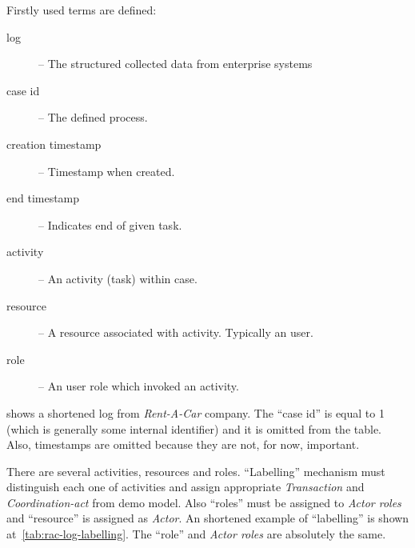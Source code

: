 Firstly used terms are defined:
\begin{description}
\item[log] -- The structured collected data from enterprise systems
\item[case id] -- The defined process.
\item[creation timestamp] -- Timestamp when created.
\item[end timestamp] -- Indicates end of given task.
\item[activity] -- An activity (task) within case.
\item[resource] -- A resource associated with activity. Typically an user.
\item[role] -- An user role which invoked an activity.
\end{description}

 shows a shortened log from \textit{Rent-A-Car} company. The ``case id'' is equal to 1 (which is generally some internal identifier) and it is omitted from the table. Also, timestamps are omitted because they are not, for now, important.  

There are several activities, resources and roles. ``Labelling'' mechanism must distinguish each one of activities and assign appropriate \textit{Transaction} and \textit{Coordination-act} from \gls{demo} model. Also ``roles'' must be assigned to \textit{Actor roles} and ``resource'' is assigned as \textit{Actor}. An shortened example of ``labelling'' is shown at~\cref{tab:rac-log-labelling}. The ``role'' and \textit{Actor roles} are absolutely the same. 

